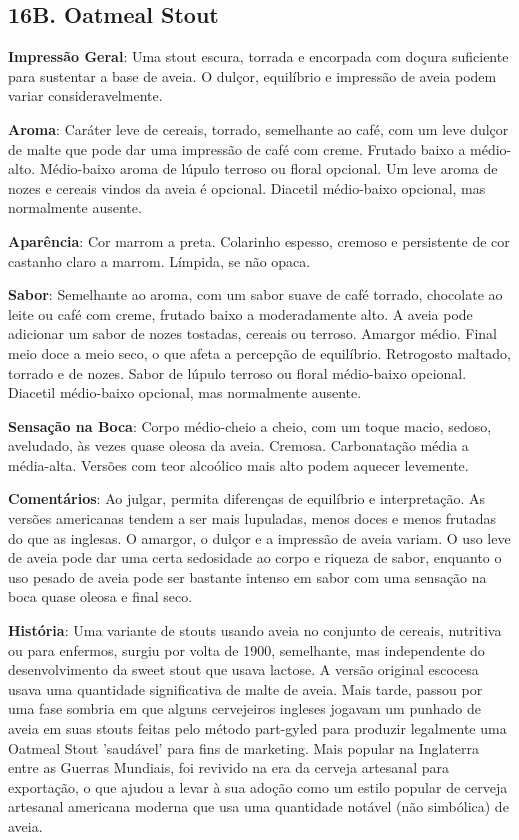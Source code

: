 \subsection*{16B. Oatmeal Stout}
\textbf{Impressão Geral}: Uma stout escura, torrada e encorpada com doçura suficiente para sustentar a base de aveia. O dulçor, equilíbrio e impressão de aveia podem variar consideravelmente.

\textbf{Aroma}: Caráter leve de cereais, torrado, semelhante ao café, com um leve dulçor de malte que pode dar uma impressão de café com creme. Frutado baixo a médio-alto. Médio-baixo aroma de lúpulo terroso ou floral opcional. Um leve aroma de nozes e cereais vindos da aveia é opcional. Diacetil médio-baixo opcional, mas normalmente ausente.

\textbf{Aparência}: Cor marrom a preta. Colarinho espesso, cremoso e persistente de cor castanho claro a marrom. Límpida, se não opaca.

\textbf{Sabor}: Semelhante ao aroma, com um sabor suave de café torrado, chocolate ao leite ou café com creme, frutado baixo a moderadamente alto. A aveia pode adicionar um sabor de nozes tostadas, cereais ou terroso. Amargor médio. Final meio doce a meio seco, o que afeta a percepção de equilíbrio. Retrogosto maltado, torrado e de nozes. Sabor de lúpulo terroso ou floral médio-baixo opcional. Diacetil médio-baixo opcional, mas normalmente ausente.

\textbf{Sensação na Boca}: Corpo médio-cheio a cheio, com um toque macio, sedoso, aveludado, às vezes quase oleosa da aveia. Cremosa. Carbonatação média a média-alta. Versões com teor alcoólico mais alto podem aquecer levemente.

\textbf{Comentários}: Ao julgar, permita diferenças de equilíbrio e interpretação. As versões americanas tendem a ser mais lupuladas, menos doces e menos frutadas do que as inglesas. O amargor, o dulçor e a impressão de aveia variam. O uso leve de aveia pode dar uma certa sedosidade ao corpo e riqueza de sabor, enquanto o uso pesado de aveia pode ser bastante intenso em sabor com uma sensação na boca quase oleosa e final seco.

\textbf{História}: Uma variante de stouts usando aveia no conjunto de cereais, nutritiva ou para enfermos, surgiu por volta de 1900, semelhante, mas independente do desenvolvimento da sweet stout que usava lactose. A versão original escocesa usava uma quantidade significativa de malte de aveia. Mais tarde, passou por uma fase sombria em que alguns cervejeiros ingleses jogavam um punhado de aveia em suas stouts feitas pelo método part-gyled para produzir legalmente uma Oatmeal Stout 'saudável' para fins de marketing. Mais popular na Inglaterra entre as Guerras Mundiais, foi revivido na era da cerveja artesanal para exportação, o que ajudou a levar à sua adoção como um estilo popular de cerveja artesanal americana moderna que usa uma quantidade notável (não simbólica) de aveia.

